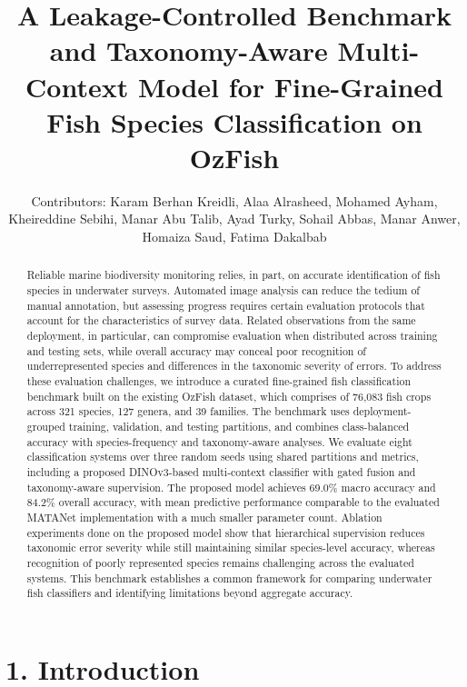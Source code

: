 \documentclass[preprint,12pt]{elsarticle}
\begin{document}
\begin{frontmatter}
\title{A Leakage-Controlled Benchmark and Taxonomy-Aware Multi-Context Model for Fine-Grained Fish Species Classification on OzFish}
\author{Contributors: Karam Berhan Kreidli, Alaa Alrasheed, Mohamed Ayham, Kheireddine Sebihi, Manar Abu Talib, Ayad Turky, Sohail Abbas, Manar Anwer, Homaiza Saud, Fatima Dakalbab}
\begin{abstract}
Reliable marine biodiversity monitoring relies, in part, on accurate
identification of fish species in underwater surveys. Automated image
analysis can reduce the tedium of manual annotation, but assessing
progress requires certain evaluation protocols that account for the
characteristics of survey data. Related observations from the same
deployment, in particular, can compromise evaluation when distributed
across training and testing sets, while overall accuracy may conceal
poor recognition of underrepresented species and differences in the
taxonomic severity of errors. To address these evaluation challenges, we
introduce a curated fine-grained fish classification benchmark built on
the existing OzFish dataset, which comprises of 76,083 fish crops across
321 species, 127 genera, and 39 families. The benchmark uses
deployment-grouped training, validation, and testing partitions, and
combines class-balanced accuracy with species-frequency and
taxonomy-aware analyses. We evaluate eight classification systems over
three random seeds using shared partitions and metrics, including a
proposed DINOv3-based multi-context classifier with gated fusion and
taxonomy-aware supervision. The proposed model achieves 69.0\% macro
accuracy and 84.2\% overall accuracy, with mean predictive performance
comparable to the evaluated MATANet implementation with a much smaller
parameter count. Ablation experiments done on the proposed model show
that hierarchical supervision reduces taxonomic error severity while
still maintaining similar species-level accuracy, whereas recognition of
poorly represented species remains challenging across the evaluated
systems. This benchmark establishes a common framework for comparing
underwater fish classifiers and identifying limitations beyond aggregate
accuracy.
\end{abstract}
\end{frontmatter}

\section*{1. Introduction}\label{introduction}
\end{document}
